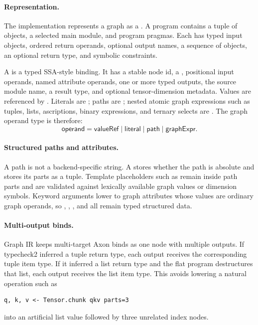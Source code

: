 \paragraph{Representation.}
The implementation represents a graph as a .  A program
contains a tuple of  objects, a selected main module, and
program pragmas.  Each  has typed input 
objects, ordered return operands, optional output names, a sequence of
 objects, an optional return type, and symbolic constraints.

A  is a typed SSA-style binding.  It has a stable node id, a
, positional input operands, named attribute operands, one or
more typed  outputs, the source module name, a result type,
and optional tensor-dimension metadata.  Values are referenced by
.  Literals are ; paths are
; nested atomic graph expressions such as tuples, lists,
ascriptions, binary expressions, and ternary selects are .
The graph operand type is therefore:
\[
  \mathsf{operand} =
  \mathsf{valueRef} \mid \mathsf{literal} \mid \mathsf{path} \mid
  \mathsf{graphExpr}.
\]

\paragraph{Structured paths and attributes.}
A path is not a backend-specific string.  A  stores whether the
path is absolute and stores its parts as a tuple.  Template placeholders such
as  remain inside path parts and are validated against lexically
available graph values or dimension symbols.  Keyword arguments lower to graph
attributes whose values are ordinary graph operands, so ,
, , and  all remain typed
structured data.

\paragraph{Multi-output binds.}
Graph IR keeps multi-target Axon binds as one node with multiple outputs.  If
typecheck2 inferred a tuple return type, each output receives the corresponding
tuple item type.  If it inferred a list return type and the flat program
destructures that list, each output receives the list item type.  This avoids
lowering a natural operation such as
\begin{verbatim}
q, k, v <- Tensor.chunk qkv parts=3
\end{verbatim}
into an artificial list value followed by three unrelated index nodes.

